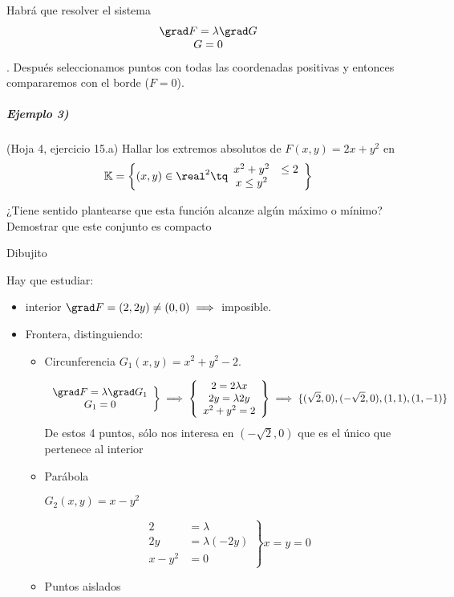 Habrá que resolver el sistema \[ \begin{matrix}\grad F=\lambda\grad G \\G=0\end{matrix} \]. Después seleccionamos puntos con todas las coordenadas positivas y entonces compararemos con el borde ($F=0$).

 
 \subparagraph{Ejemplo 3)} (Hoja 4, ejercicio 15.a)
 Hallar los extremos absolutos de $F(x,y) = 2x+y^2$ en 
 \[\mathbb{K} = \left\{(x,y)\in\real^2 \tq \begin{array}{cc} x^2+y^2 &\leq 2\\ x\leq y^2\end{array}\right\}\]
 
¿Tiene sentido plantearse que esta función alcanze algún máximo o mínimo? 
Demostrar que este conjunto es compacto	
 
 Dibujito
 
 Hay que estudiar:
 \begin{itemize}
 \item interior $\grad F = (2,2y) \neq (0,0) \implies$ imposible.
 \item Frontera, distinguiendo:
 \begin{itemize}
 \item Circunferencia
 	$G_1(x,y) = x^2+y^2-2$.
 	
 	\[\left.\begin{array}{cc}
 	\grad F = \lambda \grad G_1\\
 	G_1 = 0\end{array} \right\}\implies \left\{\begin{array}{c}
 	2 = 2\lambda x\\
 	2y = \lambda 2y\\
 	x^2+y^2=2\end{array} \right\} \implies \{(\sqrt{2},0),(-\sqrt{2},0),(1,1),(1,-1)\} \]
 	De estos 4 puntos, sólo nos interesa en $(-\sqrt{2},0)$ que es el único que pertenece al interior
 \item Parábola
 
 $G_2(x,y) = x-y^2$
 
 \[\left.\begin{array}{cc}
 2 &= \lambda\\
 2y &= \lambda (-2y)\\
 x-y^2 &=0\end{array}\right\} x=y=0\]
 \item Puntos aislados
 \end{itemize}
 \end{itemize}

